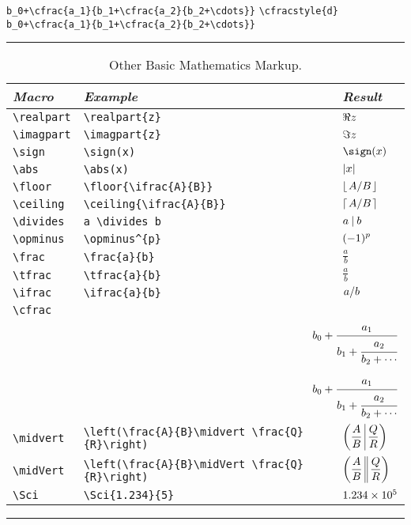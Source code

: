 \documentclass[twoside]{article}
\newenvironment{Table}[1]{%
   \begin{table}[htb]\hrule\begin{centering}\caption{#1}}{%
   \par\end{centering}\hrule\end{table}}
\newenvironment{Tabular}[1]{%
   \begingroup\def\arraystretch{1.3}\small \begin{tabular}{#1}}{%
   \end{tabular}\endgroup}
\begin{document}
\newbox\cfracexpr
\setbox\cfracexpr\hbox{\small\verb|b_0+\cfrac{a_1}{b_1+\cfrac{a_2}{b_2+\cdots}}|}%
\newbox\cfracexprD
\setbox\cfracexprD\hbox{\small\verb|\cfracstyle{d} b_0+\cfrac{a_1}{b_1+\cfrac{a_2}{b_2+\cdots}}|}%
\begin{Table}{Other Basic Mathematics Markup.\label{tab:mathmarkup}}
\begin{Tabular}{lll}
\textit{Macro} & \textit{Example} & \textit{Result} \\\hline
\verb|\realpart| &\verb|\realpart{z}| & $\Re {z}$ \\
\verb|\imagpart| &\verb|\imagpart{z}| & $\Im {z}$ \\ 
\verb|\sign| & \verb|\sign(x)| & $\sign(x)$\\
\verb|\abs| & \verb|\abs(x)| & $\left|x\right|$\\
\verb|\floor| & \verb|\floor{\ifrac{A}{B}}| & $\displaystyle\left\lfloor\left.{A}\middle/{B}\right.\right\rfloor$\\[2.0ex]
\verb|\ceiling| & \verb|\ceiling{\ifrac{A}{B}}| & $\displaystyle\left\lceil\left.{A}\middle/{B}\right.\right\rceil$\\
\verb|\divides| & \verb|a \divides b| & $ a \mathbin{|} b$\\
\verb|\opminus| & \verb|\opminus^{p}| & $\displaystyle(-1)^{p}$\\
\hline
\verb|\frac| & \verb|\frac{a}{b}| & $\displaystyle\frac{a}{b}$\\
\verb|\tfrac| & \verb|\tfrac{a}{b}| & $\displaystyle\tfrac{a}{b}$\\
\verb|\ifrac| & \verb|\ifrac{a}{b}| & $\displaystyle\left.{a}\middle/{b}\right.$\\
\verb|\cfrac| & 
    \multicolumn{2}{l}{\copy\cfracexpr} \\
 &  \multicolumn{2}{r}{$\displaystyle b_0+\cfrac{a_1}{b_1+\cfrac{a_2}{b_2+\cdots}}$}
\\[2.0ex]
 &  \multicolumn{2}{l}{\copy\cfracexprD} \\
 &  \multicolumn{2}{r}{$\displaystyle \cfracstyle{d} b_0+\cfrac{a_1}{b_1+\cfrac{a_2}{b_2+\cdots}}$}
\\[2.0ex]
\hline
\verb|\midvert| & \verb|\left(\frac{A}{B}\midvert \frac{Q}{R}\right)| & $\displaystyle\left(\frac{A}{B}\midvert \frac{Q}{R}\right)$\\[2.0ex]
\verb|\midVert| & \verb|\left(\frac{A}{B}\midVert \frac{Q}{R}\right)| & $\displaystyle\left(\frac{A}{B}\midVert \frac{Q}{R}\right)$\\[2.0ex]
\hline
\verb|\Sci| & \verb|\Sci{1.234}{5}| & $\Sci{1.234}{5}$\\
\end{Tabular}
\end{Table}
\end{document}
